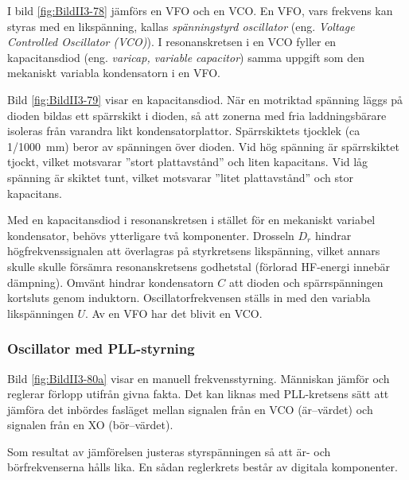 I bild \ref{fig:BildII3-78} jämförs en VFO och en VCO.
En VFO, vars frekvens kan styras med en likspänning, kallas
\emph{spänningstyrd oscillator} (eng. \emph{Voltage Controlled Oscillator
  (VCO)}).
I resonanskretsen i en VCO fyller en kapacitansdiod (eng. \emph{varicap, variable
capacitor}) samma uppgift som den mekaniskt variabla kondensatorn i en VFO.


Bild \ref{fig:BildII3-79} visar en kapacitansdiod.
När en motriktad spänning läggs på dioden bildas ett spärrskikt i dioden,
så att zonerna med fria laddningsbärare isoleras från varandra likt
kondensatorplattor.
Spärrskiktets tjocklek (ca 1/1000~mm) beror av spänningen över dioden.
Vid hög spänning är spärrskiktet tjockt, vilket motsvarar
''stort plattavstånd'' och liten kapacitans.
Vid låg spänning är skiktet tunt, vilket motsvarar ''litet plattavstånd'' och
stor kapacitans.

Med en kapacitansdiod i resonanskretsen i stället för en mekaniskt
variabel kondensator, behövs ytterligare två komponenter.
Drosseln \(D_r\) hindrar högfrekvenssignalen att överlagras på styrkretsens
likspänning, vilket annars skulle skulle försämra resonanskretsens godhetstal 
(förlorad HF-energi innebär dämpning).
Omvänt hindrar kondensatorn \(C\) att dioden och spärrspänningen kortsluts 
genom induktorn.
Oscillatorfrekvensen ställs in med den variabla likspänningen \(U\).
Av en VFO har det blivit en VCO.

\subsubsection{Oscillator med PLL-styrning}

Bild \ref{fig:BildII3-80a} visar en manuell frekvensstyrning.
Människan jämför och reglerar förlopp utifrån givna fakta.
Det kan liknas med PLL-kretsens sätt att jämföra det inbördes fasläget mellan
signalen från en VCO (är--värdet) och signalen från en XO (bör--värdet).

Som resultat av jämförelsen justeras styrspänningen så att är- och
börfrekvenserna hålls lika.
En sådan reglerkrets består av digitala komponenter.


